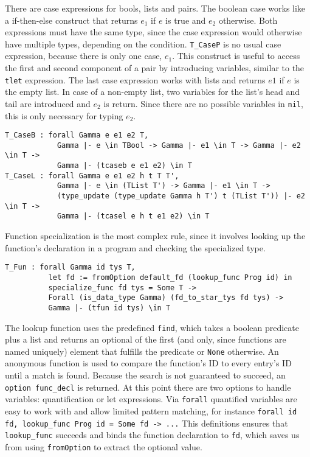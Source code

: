 \documentclass[fleqn]{scrreprt}
\newcommand{\coqinline}[1]{\texttt{#1}}
\begin{document}
There are case expressions for bools, lists and pairs. The boolean case works like a if-then-else construct that returns $e_{1}$ if $e$ is true and $e_{2}$ otherwise. Both expressions must have the same type, since the case expression would otherwise have multiple types, depending on the condition. \coqinline{T_CaseP} is no usual case expression, because there is only one case, $e_{1}$. This construct is useful to access the first and second component of a pair by introducing variables, similar to the \coqinline{tlet} expression. The last case expression works with lists and returns $e1$ if $e$ is the empty list. In case of a non-empty list, two variables for the list's head and tail are introduced and $e_{2}$ is return. Since there are no possible variables in \coqinline{nil}, this is only necessary for typing $e_{2}$.
\begin{verbatim}
T_CaseB : forall Gamma e e1 e2 T,
            Gamma |- e \in TBool -> Gamma |- e1 \in T -> Gamma |- e2 \in T ->
            Gamma |- (tcaseb e e1 e2) \in T
T_CaseL : forall Gamma e e1 e2 h t T T',
            Gamma |- e \in (TList T') -> Gamma |- e1 \in T ->
            (type_update (type_update Gamma h T') t (TList T')) |- e2 \in T ->
            Gamma |- (tcasel e h t e1 e2) \in T
\end{verbatim}
Function specialization is the most complex rule, since it involves looking up the function's declaration in a program and checking the specialized type.
\begin{verbatim}
T_Fun : forall Gamma id tys T,
          let fd := fromOption default_fd (lookup_func Prog id) in 
          specialize_func fd tys = Some T ->
          Forall (is_data_type Gamma) (fd_to_star_tys fd tys) ->
          Gamma |- (tfun id tys) \in T
\end{verbatim}
The lookup function uses the predefined \coqinline{find}, which takes a boolean predicate plus a list and returns an optional of the first (and only, since functions are named uniquely) element that fulfills the predicate or \coqinline{None} otherwise. An anonymous function is used to compare the function's ID to every entry's ID until a match is found. Because the search is not guaranteed to succeed, an \coqinline{option func_decl} is returned. At this point there are two options to handle variables: quantification or let expressions. Via \coqinline{forall} quantified variables are easy to work with and allow limited pattern matching, for instance \coqinline{forall id fd, lookup_func Prog id = Some fd -> ...} This definitions ensures that \coqinline{lookup_func} succeeds and binds the function declaration to \coqinline{fd}, which saves us from using \coqinline{fromOption} to extract the optional value.
\end{document}
